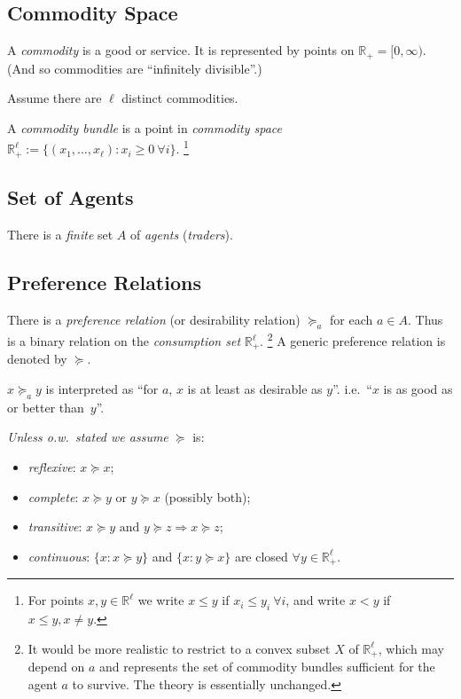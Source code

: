 \documentclass[a4paper]{amsart}
\theoremstyle{plain}
\theoremstyle{definition}
\theoremstyle{remark}
\begin{document}
\subsection{Commodity Space}
A \emph{commodity} is a good or service.  It is represented by   points on $ \mathbb{R} _+ = [0,\infty) $. (And so commodities are ``infinitely divisible''.)

Assume there are $ \ell $ distinct commodities.

A \emph{commodity bundle} is a point in \emph{commodity space} $ \mathbb{R} ^\ell_+ := \{ (x_1,\dots, x_\ell) : x_i \geq 0 \ \forall i \} $.%
\footnote{For points $ x,y \in \mathbb{R} ^\ell $ we write   $ x \leq y $ if $ x_i \leq y_i \ \forall i $, and write $ x < y $ if $ x\leq y, x\neq y $.}

\subsection{Set of Agents} There is a  \emph{finite} set $ A $ of \emph{agents} (\emph{traders}).


\subsection{Preference Relations}
There is a  \emph{preference relation} (or desirability relation) $ \succeq_a $ for each $ a\in A $.  Thus is a binary relation on the \emph{consumption set} $ \mathbb{R} ^\ell_+ $.%
\footnote{It would be more realistic to restrict to a convex subset $ X $ of $ \mathbb{R} ^\ell_+ $, which may depend on $ a $ and represents the set of commodity bundles sufficient for the agent $ a $ to survive. The theory is essentially unchanged.}
 A generic preference relation is denoted by $ \succeq $.

$ x \succeq_a y $ is interpreted as ``for $ a $, $x $ is at least as desirable as $ y $''. i.e.\ ``$ x $ is as good as or better than~$ y $''.

\emph{Unless o.w.\  stated we assume}  $ \succeq $ is:
\begin{itemize} 

\item \emph{reflexive}: $ x \succeq x $;
\item \emph{complete}: $ x \succeq y $ or   $ y \succeq x $ (possibly both);
\item \emph{transitive}: $ x \succeq y   \text{ and } y \succeq z \Longrightarrow x \succeq z$;
\item \emph{continuous}:  $\{x : x \succeq y\} $ and  $\{x : y \succeq x\} $ are closed $\forall y \in \mathbb{R} ^\ell_+ $.
\end{itemize} 
\end{document}
